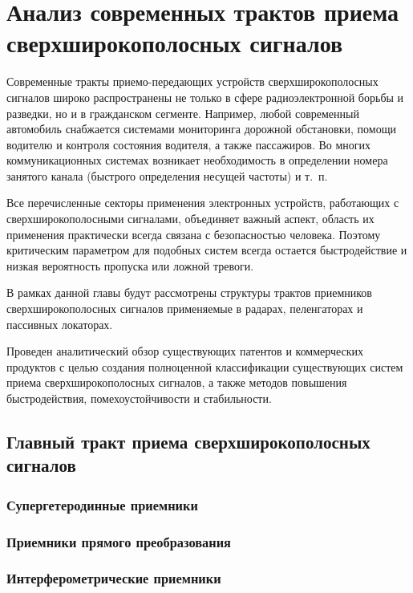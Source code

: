 \chapter{Анализ современных трактов приема сверхширокополосных сигналов}

Современные тракты приемо-передающих устройств сверхширокополосных сигналов широко распространены не только в сфере радиоэлектронной борьбы и разведки, но и в гражданском сегменте. Например, любой современный автомобиль снабжается системами мониторинга дорожной обстановки, помощи водителю и контроля состояния водителя, а также пассажиров. Во многих коммуникационных системах возникает необходимость в определении номера занятого канала (быстрого определения несущей частоты) и т.~п.

Все перечисленные секторы применения электронных устройств, работающих с сверхширокополосными сигналами, объединяет важный аспект, область их применения практически всегда связана с безопасностью человека. Поэтому критическим параметром для подобных систем всегда остается быстродействие и низкая вероятность пропуска или ложной тревоги.

В рамках данной главы будут рассмотрены структуры трактов приемников сверхширокополосных сигналов применяемые в радарах, пеленгаторах и пассивных локаторах.

Проведен аналитический обзор существующих патентов и коммерческих продуктов с целью создания полноценной классификации существующих систем приема сверхширокополосных сигналов, а также методов повышения быстродействия, помехоустойчивости и стабильности.

\section{Главный тракт приема сверхширокополосных сигналов}

\subsection{Супергетеродинные приемники}

\subsection{Приемники прямого преобразования}

\subsection{Интерферометрические приемники}

